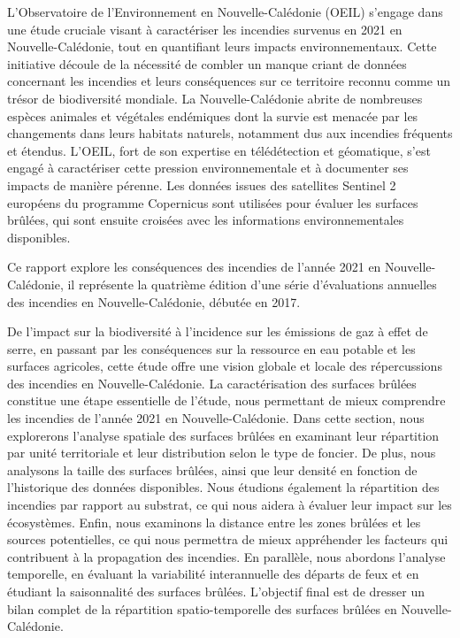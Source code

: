\documentclass[
  11pt,
  letterpaper,
]{scrreprt}
\begin{document}
L'Observatoire de l'Environnement en Nouvelle-Calédonie (OEIL) s'engage
dans une étude cruciale visant à caractériser les incendies survenus en
2021 en Nouvelle-Calédonie, tout en quantifiant leurs impacts
environnementaux. Cette initiative découle de la nécessité de combler un
manque criant de données concernant les incendies et leurs conséquences
sur ce territoire reconnu comme un trésor de biodiversité mondiale. La
Nouvelle-Calédonie abrite de nombreuses espèces animales et végétales
endémiques dont la survie est menacée par les changements dans leurs
habitats naturels, notamment dus aux incendies fréquents et étendus.
L'OEIL, fort de son expertise en télédétection et géomatique, s'est
engagé à caractériser cette pression environnementale et à documenter
ses impacts de manière pérenne. Les données issues des satellites
Sentinel 2 européens du programme Copernicus sont utilisées pour évaluer
les surfaces brûlées, qui sont ensuite croisées avec les informations
environnementales disponibles.

Ce rapport explore les conséquences des incendies de l'année 2021 en
Nouvelle-Calédonie, il représente la quatrième édition d'une série
d'évaluations annuelles des incendies en Nouvelle-Calédonie, débutée en
2017.

De l'impact sur la biodiversité à l'incidence sur les émissions de gaz à
effet de serre, en passant par les conséquences sur la ressource en eau
potable et les surfaces agricoles, cette étude offre une vision globale
et locale des répercussions des incendies en Nouvelle-Calédonie. La
caractérisation des surfaces brûlées constitue une étape essentielle de
l'étude, nous permettant de mieux comprendre les incendies de l'année
2021 en Nouvelle-Calédonie. Dans cette section, nous explorerons
l'analyse spatiale des surfaces brûlées en examinant leur répartition
par unité territoriale et leur distribution selon le type de foncier. De
plus, nous analysons la taille des surfaces brûlées, ainsi que leur
densité en fonction de l'historique des données disponibles. Nous
étudions également la répartition des incendies par rapport au substrat,
ce qui nous aidera à évaluer leur impact sur les écosystèmes. Enfin,
nous examinons la distance entre les zones brûlées et les sources
potentielles, ce qui nous permettra de mieux appréhender les facteurs
qui contribuent à la propagation des incendies. En parallèle, nous
abordons l'analyse temporelle, en évaluant la variabilité interannuelle
des départs de feux et en étudiant la saisonnalité des surfaces brûlées.
L'objectif final est de dresser un bilan complet de la répartition
spatio-temporelle des surfaces brûlées en Nouvelle-Calédonie.
\end{document}
